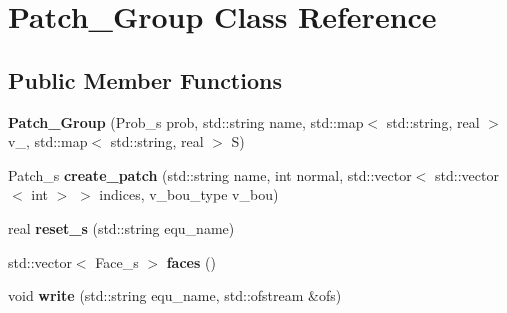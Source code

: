 \hypertarget{classPatch__Group}{\section{Patch\-\_\-\-Group Class Reference}
\label{classPatch__Group}
}
\subsection*{Public Member Functions}
\begin{DoxyCompactItemize}
\item 
\hypertarget{classPatch__Group_a7585b36431136e14c2d17e84388969be}{{\bfseries Patch\-\_\-\-Group} (Prob\-\_\-s prob, std\-::string name, std\-::map$<$ std\-::string, real $>$ v\-\_, std\-::map$<$ std\-::string, real $>$ S)}\label{classPatch__Group_a7585b36431136e14c2d17e84388969be}

\item 
\hypertarget{classPatch__Group_a77ed7a1c169f6131ba85329bfa2b2592}{Patch\-\_\-s {\bfseries create\-\_\-patch} (std\-::string name, int normal, std\-::vector$<$ std\-::vector$<$ int $>$ $>$ indices, v\-\_\-bou\-\_\-type v\-\_\-bou)}\label{classPatch__Group_a77ed7a1c169f6131ba85329bfa2b2592}

\item 
\hypertarget{classPatch__Group_ada9f56e3be9279ff5d555f2192cfc45b}{real {\bfseries reset\-\_\-s} (std\-::string equ\-\_\-name)}\label{classPatch__Group_ada9f56e3be9279ff5d555f2192cfc45b}

\item 
\hypertarget{classPatch__Group_a326628f83583bb2194f8c82548e9b6b3}{std\-::vector$<$ Face\-\_\-s $>$ {\bfseries faces} ()}\label{classPatch__Group_a326628f83583bb2194f8c82548e9b6b3}

\item 
\hypertarget{classPatch__Group_a3de7d3df9923795d4cbfa4d908e53598}{void {\bfseries write} (std\-::string equ\-\_\-name, std\-::ofstream \&ofs)}\label{classPatch__Group_a3de7d3df9923795d4cbfa4d908e53598}

\end{DoxyCompactItemize}
